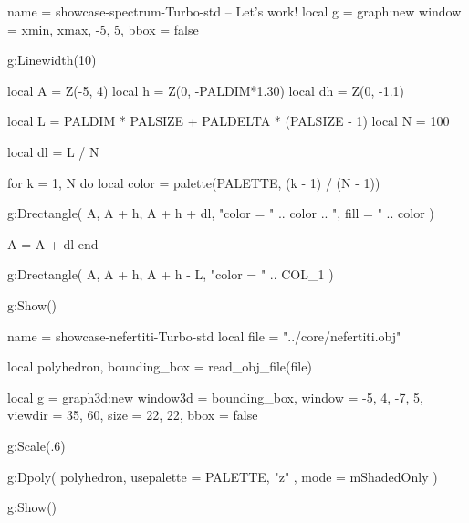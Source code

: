 \documentclass{tutodoc}
\newcommand{\PALETTE}{Turbo}
\begin{document}
\begin{luadraw}{name = showcase-spectrum-\PALETTE-std}
-- Let's work!
local g = graph:new{
  window = {xmin, xmax, -5, 5},
  bbox   = false
}

g:Linewidth(10)

local A  = Z(-5, 4)
local h  = Z(0, -PALDIM*1.30)
local dh = Z(0, -1.1)

local L = PALDIM * PALSIZE + PALDELTA * (PALSIZE - 1)
local N = 100

local dl = L / N

for k = 1, N do
  local color = palette(PALETTE, (k - 1) / (N - 1))

  g:Drectangle(
    A, A + h, A + h + dl,
    "color = " .. color .. ", fill = " .. color
  )

  A = A + dl
end

g:Drectangle(
  A, A + h, A + h - L,
  "color = " .. COL_1
)

g:Show()
\end{luadraw}



\vfill

\begin{luadraw}{name = showcase-nefertiti-\PALETTE-std}
local file = "../core/nefertiti.obj"

local polyhedron, bounding_box = read_obj_file(file)

local g = graph3d:new{
  window3d = bounding_box,
  window   = {-5, 4, -7, 5},
  viewdir  = {35, 60},
  size     = {22, 22},
  bbox     = false
}

g:Scale(.6)

g:Dpoly(
  polyhedron,
  {
    usepalette = {PALETTE, "z" },
    mode       = mShadedOnly
  }
)

g:Show()
\end{luadraw}



\vfill
\end{document}
